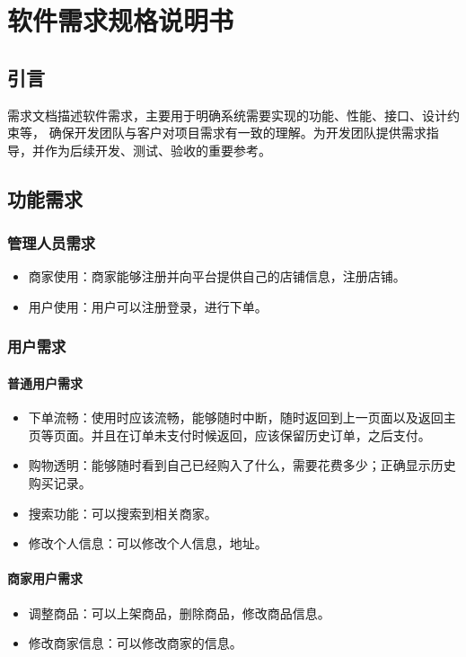 \chapter{软件需求规格说明书}
\section{引言}
需求文档描述软件需求，主要用于明确系统需要实现的功能、性能、接口、设计约束等，
确保开发团队与客户对项目需求有一致的理解。为开发团队提供需求指导，并作为后续开发、测试、验收的重要参考。
\section{功能需求}

\subsection{管理人员需求}
\begin{itemize}
    \item{商家使用}：商家能够注册并向平台提供自己的店铺信息，注册店铺。
    \item{用户使用}：用户可以注册登录，进行下单。
\end{itemize}


\subsection{用户需求}
\subsubsection{普通用户需求}
\begin{itemize}
    \item{下单流畅}：使用时应该流畅，能够随时中断，随时返回到上一页面以及返回主页等页面。并且在订单未支付时候返回，应该保留历史订单，之后支付。
    \item{购物透明}：能够随时看到自己已经购入了什么，需要花费多少；正确显示历史购买记录。
    \item {搜索功能}：可以搜索到相关商家。
    \item {修改个人信息}：可以修改个人信息，地址。
\end{itemize}

\subsubsection{商家用户需求}
\begin{itemize}
    \item {调整商品}：可以上架商品，删除商品，修改商品信息。
    \item{修改商家信息}：可以修改商家的信息。
\end{itemize}

